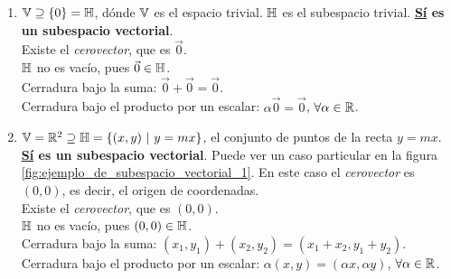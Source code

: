 \begin{enumerate}
    \renewcommand{\labelenumi}{\textbf{\arabic{enumi})}}

    \item $\mathbb{V} \supseteq \{0\} = \mathbb{H}$, dónde $\mathbb{V}$ es el espacio trivial. $\mathbb{H}$ es el subespacio trivial. \textbf{\underline{Sí} es un subespacio vectorial}. \\
        \checkmark Existe el \textit{cerovector}, que es $\vec{0}$. \\
        \checkmark $\mathbb{H}$ no es vacío, pues $\vec{0} \in \mathbb{H}$. \\
        \checkmark Cerradura bajo la suma: $\vec{0} + \vec{0} = \vec{0}$. \\
        \checkmark Cerradura bajo el producto por un escalar: $\alpha \vec{0} = \vec{0}$, $\forall \alpha \in \mathbb{R}$.

    \item $\mathbb{V} = \mathbb{R}^2 \supseteq \mathbb{H} = \left\{ (x, y) \ | \ y = mx \right\}$, el conjunto de puntos de la recta $y = mx$. \textbf{\underline{Sí} es un subespacio vectorial}. Puede ver un caso particular en la figura \ref{fig:ejemplo_de_subespacio_vectorial_1}. En este caso el \textit{cerovector} es $(0, 0)$, es decir, el origen de coordenadas.\\
        \checkmark Existe el \textit{cerovector}, que es $(0, 0)$. \\
        \checkmark $\mathbb{H}$ no es vacío, pues $(0, 0) \in \mathbb{H}$. \\
        \checkmark Cerradura bajo la suma: $(x_1, y_1) + (x_2, y_2) = (x_1 + x_2, y_1 + y_2)$. \\
        \checkmark Cerradura bajo el producto por un escalar: $\alpha (x, y) = (\alpha x, \alpha y)$, $\forall \alpha \in \mathbb{R}$.
    \begin{figure}
        \centering
\end{figure}
\end{enumerate}
